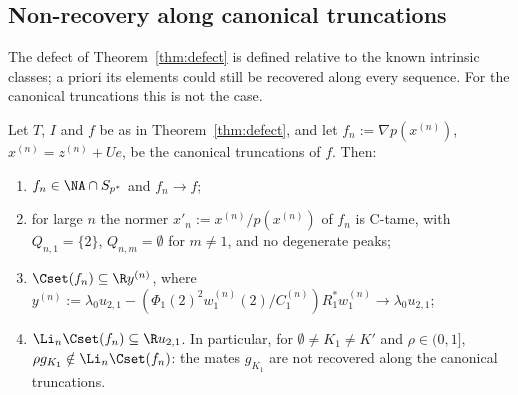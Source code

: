 \subsection{Non-recovery along canonical truncations}
The defect of Theorem~\ref{thm:defect} is defined relative to the known
intrinsic classes; a priori its elements could still be recovered along
every sequence.  For the canonical truncations this is not the case.

\begin{proposition}\label{prop:nonrecovery}
Let $T$, $I$ and $f$ be as in Theorem~\ref{thm:defect}, and let
$f_n:=\nabla p(x^{(n)})$, $x^{(n)}=z^{(n)}+Ue$, be the canonical truncations
of $f$.  Then:
\begin{enumerate}
\item[(a)] $f_n\in\NA\cap S_{p^*}$ and $f_n\to f$;
\item[(b)] for large $n$ the normer $x'_n:=x^{(n)}/p(x^{(n)})$ of $f_n$ is
C-tame, with $Q_{n,1}=\{2\}$, $Q_{n,m}=\emptyset$ for $m\ne1$, and no
degenerate peaks;
\item[(c)] $\Cset(f_n)\subseteq\R y^{(n)}$, where
$y^{(n)}:=\lambda_0u_{2,1}-(\Phi_1(2)^2w^{(n)}_1(2)/C^{(n)}_1)R_1^*w^{(n)}_1
\to\lambda_0u_{2,1}$;
\item[(d)] $\Li_n\Cset(f_n)\subseteq\R u_{2,1}$.  In particular, for
$\emptyset\ne K_1\ne K'$ and $\rho\in(0,1]$, $\rho g_{K_1}\notin
\Li_n\Cset(f_n)$: the mates $g_{K_1}$ are not recovered along the canonical
truncations.
\end{enumerate}
\end{proposition}

